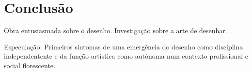 \documentclass{article}
\begin{document}
\section{Conclusão}

Obra entusiasmada sobre o desenho. Investigação sobre a arte de
desenhar.

Especulação: Primeiros sintomas de uma emergência do desenho como
disciplina independentente e da função artística como autónoma num
contexto profissional e social florescente.

\printbibliography[heading=bibliography,title={Bibliografia},type=book]
\printbibliography[heading=subbibliography,title={Reproduções},type=artwork]
\end{document}
